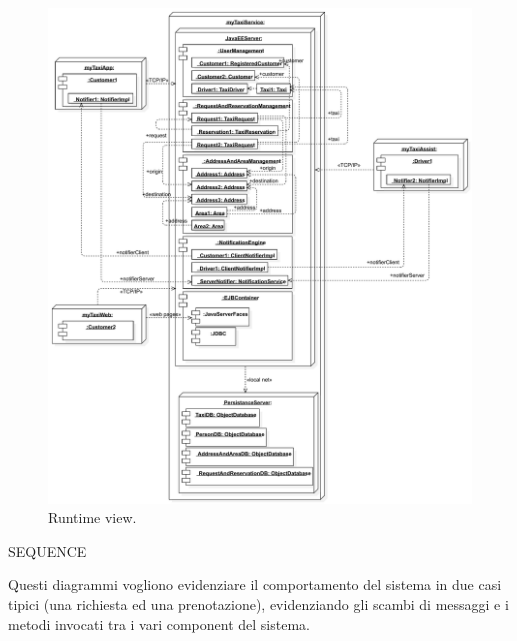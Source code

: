 \begin{figure}
	\includegraphics[width=\textwidth]{img/Runtime__RuntimeView_5}
	\caption{Runtime view.}
	\label{img:runtime}
\end{figure}



SEQUENCE

Questi diagrammi vogliono evidenziare il comportamento del sistema in due casi tipici (una richiesta ed una prenotazione), evidenziando gli scambi di messaggi e i metodi invocati tra i vari component del sistema.



